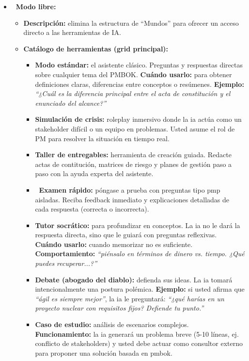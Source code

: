 \begin{itemize}
\item \textbf{\faInfinity\ Modo libre:}
\begin{itemize}
\item \textbf{Descripción:} elimina la estructura de \enquote{Mundos} para ofrecer un acceso directo a las herramientas de IA.
\item \textbf{Catálogo de herramientas (grid principal):}
\begin{itemize}
\item \textbf{\faBook Modo estándar:} el asistente clásico. Preguntas y respuestas directas sobre cualquier tema del PMBOK. \textbf{Cuándo usarlo:} para obtener definiciones claras, diferencias entre conceptos o resúmenes. \textbf{Ejemplo:} \textit{\enquote{¿Cuál es la diferencia principal entre el acta de constitución y el enunciado del alcance?}}
\item \textbf{\faExclamationTriangle Simulación de crisis:} roleplay inmersivo donde la \gls{ia} actúa como un stakeholder difícil o un equipo en problemas. Usted asume el rol de PM para resolver la situación en tiempo real.
\item \textbf{\faWrench Taller de entregables:} herramienta de creación guiada. Redacte actas de contitución, matrices de riesgo y planes de gestión paso a paso con la ayuda experta del asistente.
\item \textbf{\faEdit\ Examen rápido:} póngase a prueba con preguntas tipo \gls{pmp} aisladas. Reciba feedback inmediato y explicaciones detalladas de cada respuesta (correcta o incorrecta).
\item \textbf{\faBrain Tutor socrático:} para profundizar en conceptos. La \gls{ia} no le dará la respuesta directa, sino que le guiará con preguntas reflexivas. \textbf{Cuándo usarlo:} cuando memorizar no es suficiente. \textbf{Comportamiento:} \textit{\enquote{piénsalo en términos de dinero vs. tiempo. ¿Qué puedes recuperar...?}}
\item \textbf{\faGavel Debate (abogado del diablo):} defienda sus ideas. La \gls{ia} tomará intencionalmente una postura polémica. \textbf{Ejemplo:} si usted afirma que \textit{\enquote{ágil es siempre mejor}}, la \gls{ia} le preguntará: \textit{\enquote{¿qué harías en un proyecto nuclear con requisitos fijos? Defiende tu punto.}}
\item \textbf{\faBriefcase Caso de estudio:} análisis de escenarios complejos. \textbf{Funcionamiento:} la \gls{ia} generará un problema breve (5-10 líneas, ej. conflicto de stakeholders) y usted debe actuar como consultor externo para proponer una solución basada en \gls{pmbok}.

\end{itemize}
\end{itemize}
\end{itemize}
